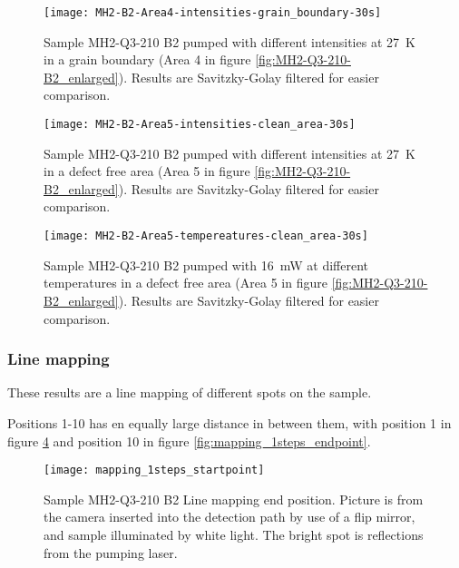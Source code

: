 \begin{figure}[H]
\centering
\texttt{[image: MH2-B2-Area4-intensities-grain\_boundary-30s]}
\caption[MH2-Q3-210 at area 4 with different intensities]{Sample MH2-Q3-210 B2 pumped with different intensities at 27~K in a grain boundary (Area 4 in figure \ref{fig:MH2-Q3-210-B2_enlarged}). Results are Savitzky-Golay filtered for easier comparison.}
\label{fig:MH2-B2-Area4-intensities-grain_boundary-30s}%
\end{figure}


\begin{figure}[H]
\centering
\texttt{[image: MH2-B2-Area5-intensities-clean\_area-30s]}
\caption[MH2-Q3-210 at area 5 with different intensities]{Sample MH2-Q3-210 B2 pumped with different intensities at 27~K in a defect free area (Area 5 in figure \ref{fig:MH2-Q3-210-B2_enlarged}). Results are Savitzky-Golay filtered for easier comparison.}
\label{fig:MH2-B2-Area5-intensities-clean_area-30s}%
\end{figure}


\begin{figure}[H]
\centering
\texttt{[image: MH2-B2-Area5-tempereatures-clean\_area-30s]}
\caption[MH2-Q3-210 at area 5 with different temperatures]{Sample MH2-Q3-210 B2 pumped with 16~mW at different temperatures in a defect free area (Area 5 in figure \ref{fig:MH2-Q3-210-B2_enlarged}). Results are Savitzky-Golay filtered for easier comparison.}
\label{fig:MH2-B2-Area5-tempereatures-clean_area-30s}%
\end{figure}







\subsubsection{Line mapping}

These results are a line mapping of different spots on the sample.

Positions 1-10 has en equally large distance in between them, with position 1 in figure \ref{fig:mapping_1steps_startpoint} and position 10 in figure \ref{fig:mapping_1steps_endpoint}.

\begin{figure}[H]
\centering
\texttt{[image: mapping\_1steps\_startpoint]}
\caption[MH2-Q3-210 line mapping start position]{Sample MH2-Q3-210 B2 Line mapping end position. Picture is from the camera inserted into the detection path by use of a flip mirror, and sample illuminated by white light. The bright spot is reflections from the pumping laser.}
\label{fig:mapping_1steps_startpoint}%
\end{figure}


